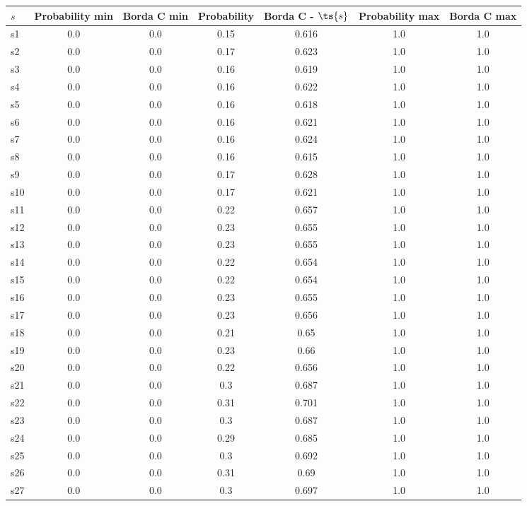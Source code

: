 \documentclass{article}
\begin{document}
\noindent\begin{tabular}{|l|c|c|c|c|c|c|}
\hline
$s$& Probability min & Borda C min & Probability & Borda C - $\ts{s}$ & Probability max & Borda C max\\
\hline
s1 &0.0 & 0.0 & 0.15 & 0.616 & 1.0 & 1.0\\
\hline
s2 &0.0 & 0.0 & 0.17 & 0.623 & 1.0 & 1.0\\
\hline
s3 &0.0 & 0.0 & 0.16 & 0.619 & 1.0 & 1.0\\
\hline
s4 &0.0 & 0.0 & 0.16 & 0.622 & 1.0 & 1.0\\
\hline
s5 &0.0 & 0.0 & 0.16 & 0.618 & 1.0 & 1.0\\
\hline
s6 &0.0 & 0.0 & 0.16 & 0.621 & 1.0 & 1.0\\
\hline
s7 &0.0 & 0.0 & 0.16 & 0.624 & 1.0 & 1.0\\
\hline
s8 &0.0 & 0.0 & 0.16 & 0.615 & 1.0 & 1.0\\
\hline
s9 &0.0 & 0.0 & 0.17 & 0.628 & 1.0 & 1.0\\
\hline
s10 &0.0 & 0.0 & 0.17 & 0.621 & 1.0 & 1.0\\
\hline
s11 &0.0 & 0.0 & 0.22 & 0.657 & 1.0 & 1.0\\
\hline
s12 &0.0 & 0.0 & 0.23 & 0.655 & 1.0 & 1.0\\
\hline
s13 &0.0 & 0.0 & 0.23 & 0.655 & 1.0 & 1.0\\
\hline
s14 &0.0 & 0.0 & 0.22 & 0.654 & 1.0 & 1.0\\
\hline
s15 &0.0 & 0.0 & 0.22 & 0.654 & 1.0 & 1.0\\
\hline
s16 &0.0 & 0.0 & 0.23 & 0.655 & 1.0 & 1.0\\
\hline
s17 &0.0 & 0.0 & 0.23 & 0.656 & 1.0 & 1.0\\
\hline
s18 &0.0 & 0.0 & 0.21 & 0.65 & 1.0 & 1.0\\
\hline
s19 &0.0 & 0.0 & 0.23 & 0.66 & 1.0 & 1.0\\
\hline
s20 &0.0 & 0.0 & 0.22 & 0.656 & 1.0 & 1.0\\
\hline
s21 &0.0 & 0.0 & 0.3 & 0.687 & 1.0 & 1.0\\
\hline
s22 &0.0 & 0.0 & 0.31 & 0.701 & 1.0 & 1.0\\
\hline
s23 &0.0 & 0.0 & 0.3 & 0.687 & 1.0 & 1.0\\
\hline
s24 &0.0 & 0.0 & 0.29 & 0.685 & 1.0 & 1.0\\
\hline
s25 &0.0 & 0.0 & 0.3 & 0.692 & 1.0 & 1.0\\
\hline
s26 &0.0 & 0.0 & 0.31 & 0.69 & 1.0 & 1.0\\
\hline
s27 &0.0 & 0.0 & 0.3 & 0.697 & 1.0 & 1.0\\

\end{tabular}
\end{document}
